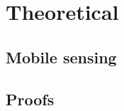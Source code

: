 \documentclass[a4paper]{report}
\theoremstyle{plain}
\begin{document}
    
    
    
    
    
    
    

\part{Theoretical}
 \clearpage
\chapter{Mobile sensing} \label{chap:application}  
    
    
  
        
    
    
\clearpage



  








\clearpage
\appendix
{}
\chapter{Proofs}

\end{document}
